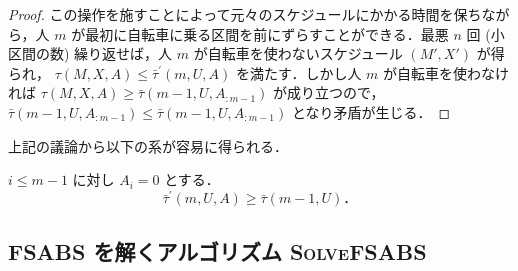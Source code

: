 \begin{proof}
この操作を施すことによって元々のスケジュールにかかる時間を保ちながら，人 $m$ が最初に自転車に乗る区間を前にずらすことができる．最悪 $n$ 回 (小区間の数) 繰り返せば，人 $m$ が自転車を使わないスケジュール $(M\prime, X\prime)$ が得られ， $\tau(M, X, A) \leq \bar\tau^{\prime}(m, U, A)$ を満たす．しかし人 $m$ が自転車を使わなければ $\tau(M, X, A) \geq \bar\tau(m - 1, U, A_{:m-1})$ が成り立つので， $\bar\tau(m - 1, U, A_{:m-1}) \leq \bar\tau(m - 1, U,A_{:m-1})$ となり矛盾が生じる．
\end{proof}
上記の議論から以下の系が容易に得られる．
\begin{corollary}
  $i \leq m - 1$ に対し $A_i = 0$ とする．
  \begin{equation}
    \bar\tau^{\prime}(m, U, A) \geq \bar\tau(m - 1, U)．
  \end{equation}
\end{corollary}

\subsection{FSABS を解くアルゴリズム \textsc{SolveFSABS}}

